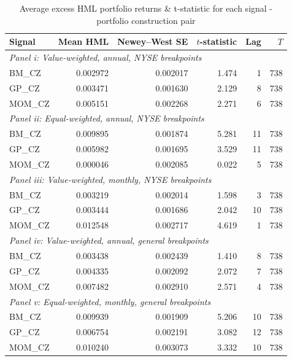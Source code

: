 \documentclass[11pt]{article}
\begin{document}
\begin{table}[H]
  \centering
  \caption{Average excess HML portfolio returns \& t-statistic for each signal - portfolio construction pair}
  \label{tab:3c_hml}
  \begin{tabular}{lrrrrr}
    \hline
    Signal & Mean HML & Newey--West SE & $t$-statistic & Lag & $T$ \\
    \hline
    \multicolumn{6}{l}{\textit{Panel i: Value-weighted, annual, NYSE breakpoints}} \\
    BM\_CZ & 0.002972 & 0.002017 & 1.474 & 1 & 738 \\
    GP\_CZ & 0.003471 & 0.001630 & 2.129 & 8 & 738 \\
    MOM\_CZ & 0.005151 & 0.002268 & 2.271 & 6 & 738 \\
    \hline
    \multicolumn{6}{l}{\textit{Panel ii: Equal-weighted, annual, NYSE breakpoints}} \\
    BM\_CZ & 0.009895 & 0.001874 & 5.281 & 11 & 738 \\
    GP\_CZ & 0.005982 & 0.001695 & 3.529 & 11 & 738 \\
    MOM\_CZ & 0.000046 & 0.002085 & 0.022 & 5 & 738 \\
    \hline
    \multicolumn{6}{l}{\textit{Panel iii: Value-weighted, monthly, NYSE breakpoints}} \\
    BM\_CZ & 0.003219 & 0.002014 & 1.598 & 3 & 738 \\
    GP\_CZ & 0.003444 & 0.001686 & 2.042 & 10 & 738 \\
    MOM\_CZ & 0.012548 & 0.002717 & 4.619 & 1 & 738 \\
    \hline
    \multicolumn{6}{l}{\textit{Panel iv: Value-weighted, annual, general breakpoints}} \\
    BM\_CZ & 0.003438 & 0.002439 & 1.410 & 8 & 738 \\
    GP\_CZ & 0.004335 & 0.002092 & 2.072 & 7 & 738 \\
    MOM\_CZ & 0.007482 & 0.002910 & 2.571 & 4 & 738 \\
    \hline
    \multicolumn{6}{l}{\textit{Panel v: Equal-weighted, monthly, general breakpoints}} \\
    BM\_CZ & 0.009939 & 0.001909 & 5.206 & 10 & 738 \\
    GP\_CZ & 0.006754 & 0.002191 & 3.082 & 12 & 738 \\
    MOM\_CZ & 0.010240 & 0.003073 & 3.332 & 10 & 738 \\
    \hline
  \end{tabular}
\end{table}
\end{document}
